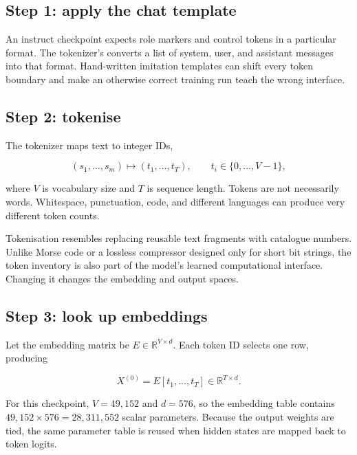 \subsection{Step 1: apply the chat template}

An instruct checkpoint expects role markers and control tokens in a particular
format.
The tokenizer's  converts a list of system, user, and
assistant messages into that format.
Hand-written imitation templates can shift every token boundary and make an
otherwise correct training run teach the wrong interface.

\subsection{Step 2: tokenise}

The tokenizer maps text to integer IDs,

\begin{equation}
    (s_1,\ldots,s_m) \longmapsto (t_1,\ldots,t_T),
    \qquad t_i\in\{0,\ldots,V-1\},
    \label{eq:text-to-token-ids}
\end{equation}

where $V$ is vocabulary size and $T$ is sequence length.
Tokens are not necessarily words.
Whitespace, punctuation, code, and different languages can produce very
different token counts.

\begin{plainlanguage}
Tokenisation resembles replacing reusable text fragments with catalogue
numbers.
Unlike Morse code or a lossless compressor designed only for short bit strings,
the token inventory is also part of the model's learned computational interface.
Changing it changes the embedding and output spaces.
\end{plainlanguage}

\subsection{Step 3: look up embeddings}

Let the embedding matrix be $E\in\mathbb{R}^{V\times d}$.
Each token ID selects one row, producing

\begin{equation}
    X^{(0)} = E[t_1,\ldots,t_T]
    \in\mathbb{R}^{T\times d}.
    \label{eq:embedding-lookup}
\end{equation}

For this checkpoint, $V=49{,}152$ and $d=576$, so the embedding table contains
$49{,}152\times576=28{,}311{,}552$ scalar parameters.
Because the output weights are tied, the same parameter table is reused when
hidden states are mapped back to token logits.

